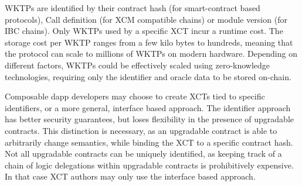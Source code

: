 WKTPs are identified by their contract hash (for smart-contract based protocols), Call definition (for XCM compatible chains) or module version (for IBC chains). Only WKTPs used by a specific XCT incur a runtime cost. The storage cost per WKTP ranges from a few kilo bytes to hundreds, meaning that the protocol can scale to millions of WKTPs on modern hardware. Depending on different factors, WKTPs could be effectively scaled using zero-knowledge technologies, requiring only the identifier and oracle data to be stored on-chain. 

Composable dapp developers may choose to create XCTs tied to specific identifiers, or a more general, interface based approach. The identifier approach has better security guarantees, but loses flexibility in the presence of upgradable contracts. This distinction is necessary, as an upgradable contract is able to arbitrarily change semantics, while binding the XCT to a specific contract hash. Not all upgradable contracts can be uniquely identified, as keeping track of a chain of logic delegations within upgradable contracts is prohibitively expensive. In that case XCT authors may only use the interface based approach.
